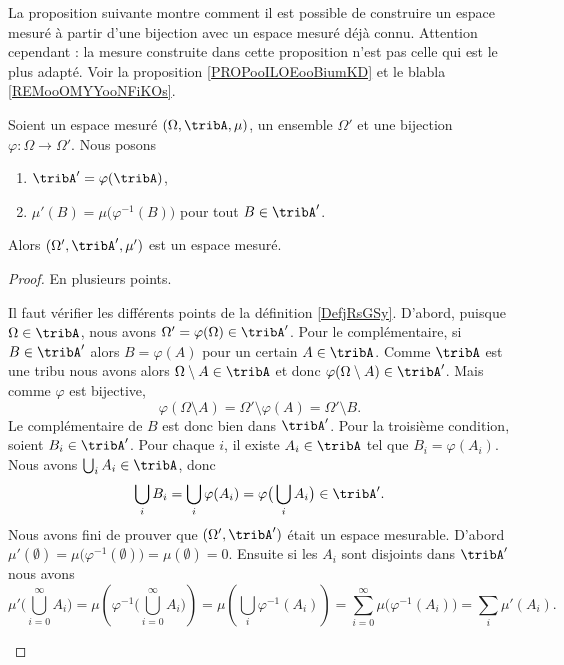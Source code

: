La proposition suivante montre comment il est possible de construire un espace mesuré à partir d'une bijection avec un espace mesuré déjà connu. Attention cependant : la mesure construite dans cette proposition n'est pas celle qui est le plus adapté. Voir la proposition \ref{PROPooILOEooBiumKD} et le blabla \ref{REMooOMYYooNFiKOs}.
\begin{proposition}     \label{PROPooXQHTooUxJoyq}
	Soient un espace mesuré \( (\Omega,\tribA,\mu)\), un ensemble \( \Omega'\) et une bijection \( \varphi\colon \Omega\to \Omega'\). Nous posons
	\begin{enumerate}
		\item
		      \( \tribA'=\varphi(\tribA)\),
		\item
		      \( \mu'(B)=\mu\big( \varphi^{-1}(B) \big)\) pour tout \( B\in\tribA'\).
	\end{enumerate}
	Alors \( (\Omega',\tribA',\mu')\) est un espace mesuré.
\end{proposition}

\begin{proof}
	En plusieurs points.
	\begin{subproof}
		Il faut vérifier les différents points de la définition \ref{DefjRsGSy}. D'abord, puisque \( \Omega\in\tribA\), nous avons \( \Omega'=\varphi(\Omega)\in \tribA'\). Pour le complémentaire, si \( B\in\tribA'\) alors \( B=\varphi(A)\) pour un certain \( A\in \tribA\). Comme \( \tribA\) est une tribu nous avons alors \( \Omega\setminus A\in\tribA\) et donc \( \varphi(\Omega\setminus A)\in \tribA'\). Mais comme \( \varphi\) est bijective,
		\begin{equation}
			\varphi(\Omega\setminus A)=\Omega'\setminus\varphi(A)=\Omega'\setminus B.
		\end{equation}
		Le complémentaire de \( B\) est donc bien dans \( \tribA'\). Pour la troisième condition, soient \( B_i\in\tribA'\). Pour chaque \( i\), il existe \( A_i\in \tribA\) tel que \( B_i=\varphi(A_i)\). Nous avons \( \bigcup_iA_i\in \tribA\), donc
		\begin{equation}
			\bigcup_iB_i=\bigcup_i\varphi(A_i)=\varphi\big( \bigcup_iA_i \big)\in \tribA'.
		\end{equation}
		Nous avons fini de prouver que \( (\Omega',\tribA')\) était un espace mesurable.
		D'abord \( \mu'(\emptyset)=\mu\big( \varphi^{-1}(\emptyset) \big)=\mu(\emptyset)=0\). Ensuite si les \( A_i\) sont disjoints dans \( \tribA'\) nous avons
		\begin{equation}
			\mu'\big( \bigcup_{i=0}^{\infty}A_i \big)=\mu\left( \varphi^{-1}\big( \bigcup_{i=0}^{\infty}A_i \big) \right)=\mu\left( \bigcup_i\varphi^{-1}(A_i) \right)=\sum_{i=0}^{\infty}\mu\big( \varphi^{-1}(A_i) \big)=\sum_i\mu'(A_i).
		\end{equation}
	\end{subproof}
\end{proof}

